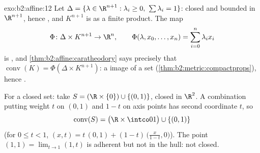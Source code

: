 \begin{solution}{exo:b2:affine:12}
Let $\Delta = \{\lambda \in \R^{n+1} : \lambda_i \geq 0,\
\sum\lambda_i = 1\}$: closed and bounded in $\R^{n+1}$, hence
, and $K^{n+1}$ is  as a finite product. The map
\[
\Phi \colon \Delta \times K^{n+1} \to \R^n, \qquad
\Phi(\lambda, x_0, \dots, x_n) = \sum_{i=0}^n \lambda_i x_i
\]
is , and \cref{thm:b2:affine:caratheodory} says
precisely that $\operatorname{conv}(K) = \Phi(\Delta \times
K^{n+1})$: a  image of a  set
(\cref{thm:b2:metric:compactprops}), hence \omterm{def:b2:metric:compact}{compact}.

For a closed set: take $S = (\R \times \{0\}) \cup \{(0,
1)\}$, closed in $\R^2$. A  combination putting weight
$t$ on $(0,1)$ and $1 - t$ on axis points has second
coordinate $t$, so
\[
\operatorname{conv}(S) = \bigl(\R \times \intco01\bigr) \cup
\{(0,1)\}
\]
(for $0 \leq t < 1$, $(x, t) = t\,(0,1) + (1-t)\,\bigl(\tfrac
x{1-t}, 0\bigr)$). The point $(1, 1) = \lim_{t \to 1}(1, t)$
is adherent but not in the hull: not closed.
\end{solution}


